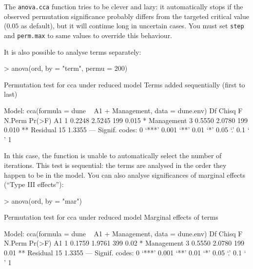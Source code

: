 \documentclass[a4paper,10pt]{amsart}
\begin{document}
The \texttt{anova.cca} function tries to be clever and lazy: it
automatically stops if the observed permutation significance probably
differs from the targeted critical value ($0.05$ as default), but it
will continue long in uncertain cases.  You must set \texttt{step} and
\texttt{perm.max} to same values to override this behaviour.

It is also possible to analyse terms separately:
\begin{Schunk}
\begin{Sinput}
> anova(ord, by = "term", permu = 200)
\end{Sinput}
\begin{Soutput}
Permutation test for cca under reduced model
Terms added sequentially (first to last)

Model: cca(formula = dune ~ A1 + Management, data = dune.env)
           Df  Chisq      F N.Perm Pr(>F)   
A1          1 0.2248 2.5245    199  0.015 * 
Management  3 0.5550 2.0780    199  0.010 **
Residual   15 1.3355                        
---
Signif. codes:  0 ‘***’ 0.001 ‘**’ 0.01 ‘*’ 0.05 ‘.’ 0.1 ‘ ’ 1 
\end{Soutput}
\end{Schunk}
In this case, the function is unable to automatically select the
number of iterations. This test is sequential: the terms are analysed
in the order they happen to be in the model. You can also analyse
significances of marginal effects (``Type III effects''):
\begin{Schunk}
\begin{Sinput}
> anova(ord, by = "mar")
\end{Sinput}
\begin{Soutput}
Permutation test for cca under reduced model
Marginal effects of terms

Model: cca(formula = dune ~ A1 + Management, data = dune.env)
           Df  Chisq      F N.Perm Pr(>F)   
A1          1 0.1759 1.9761    399   0.02 * 
Management  3 0.5550 2.0780    199   0.01 **
Residual   15 1.3355                        
---
Signif. codes:  0 ‘***’ 0.001 ‘**’ 0.01 ‘*’ 0.05 ‘.’ 0.1 ‘ ’ 1 
\end{Soutput}
\end{Schunk}
\end{document}

